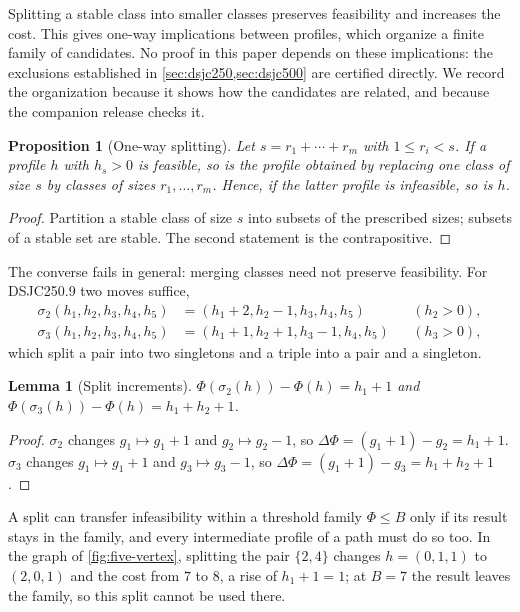 \documentclass[11pt]{article}
\newtheorem{lemma}[theorem]{Lemma}
\newtheorem{proposition}[theorem]{Proposition}
\theoremstyle{definition}
\newcommand{\DSJCTwoFifty}{\textnormal{\textsc{DSJC250.9}}}
\begin{document}
Splitting a stable class into smaller classes preserves feasibility and
increases the cost. This gives one-way implications between profiles, which
organize a finite family of candidates. No proof in this paper depends on
these implications: the exclusions established in
\cref{sec:dsjc250,sec:dsjc500} are certified directly. We record the
organization because it shows how the candidates are related, and because
the companion release checks it.

\begin{proposition}[One-way splitting]
\label{prop:general-splitting}
Let $s=r_1+\cdots+r_m$ with $1\le r_i<s$. If a profile $h$ with $h_s>0$ is
feasible, so is the profile obtained by replacing one class of size $s$ by
classes of sizes $r_1,\ldots,r_m$. Hence, if the latter profile is
infeasible, so is $h$.
\end{proposition}

\begin{proof}
Partition a stable class of size $s$ into subsets of the prescribed sizes;
subsets of a stable set are stable. The second statement is the
contrapositive.
\end{proof}

The converse fails in general: merging classes need not preserve
feasibility. For \DSJCTwoFifty{} two moves suffice,
\begin{align*}
  \sigma_2(h_1,h_2,h_3,h_4,h_5)&=(h_1+2,h_2-1,h_3,h_4,h_5) && (h_2>0),\\
  \sigma_3(h_1,h_2,h_3,h_4,h_5)&=(h_1+1,h_2+1,h_3-1,h_4,h_5) && (h_3>0),
\end{align*}
which split a pair into two singletons and a triple into a pair and a
singleton.

\begin{lemma}[Split increments]
\label{lem:split-increments}
$\Phi(\sigma_2(h))-\Phi(h)=h_1+1$ and $\Phi(\sigma_3(h))-\Phi(h)=h_1+h_2+1$.
\end{lemma}

\begin{proof}
$\sigma_2$ changes $g_1\mapsto g_1+1$ and $g_2\mapsto g_2-1$, so
$\Delta\Phi=(g_1+1)-g_2=h_1+1$. $\sigma_3$ changes $g_1\mapsto g_1+1$ and
$g_3\mapsto g_3-1$, so $\Delta\Phi=(g_1+1)-g_3=h_1+h_2+1$.
\end{proof}

A split can transfer infeasibility within a threshold family $\Phi\le B$ only
if its result stays in the family, and every intermediate profile of a path
must do so too. In the graph of \cref{fig:five-vertex}, splitting the pair
$\{2,4\}$ changes $h=(0,1,1)$ to $(2,0,1)$ and the cost from $7$ to $8$, a
rise of $h_1+1=1$; at $B=7$ the result leaves the family, so this split cannot
be used there.
\end{document}
